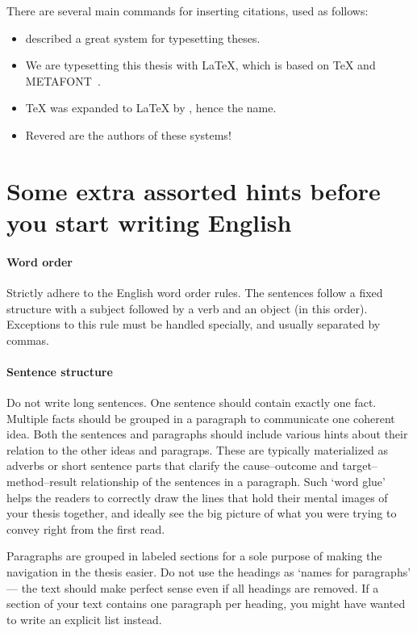 There are several main commands for inserting citations, used as follows:
\begin{itemize}
\item \citet{knuth1979tex} described a great system for typesetting theses.
\item We are typesetting this thesis with \LaTeX, which is based on \TeX{} and METAFONT~\cite{knuth1979tex}.
\item \TeX{} was expanded to \LaTeX{} by \citet{lamport1994latex}, hence the name.
\item Revered are the authors of these systems!~\cite{knuth1979tex,lamport1994latex}
\end{itemize}

\section{Some extra assorted hints before you start writing English}

\paragraph{Word order}
Strictly adhere to the English word order rules. The sentences follow a fixed structure with a subject followed by a verb and an object (in this order). Exceptions to this rule must be handled specially, and usually separated by commas.

\paragraph{Sentence structure}
Do not write long sentences. One sentence should contain exactly one fact. Multiple facts should be grouped in a paragraph to communicate one coherent idea. Both the sentences and paragraphs should include various hints about their relation to the other ideas and paragraps. These are typically materialized as adverbs or short sentence parts that clarify the cause--outcome and target--method--result relationship of the sentences in a paragraph. Such `word glue' helps the readers to correctly draw the lines that hold their mental images of your thesis together, and ideally see the big picture of what you were trying to convey right from the first read.

Paragraphs are grouped in labeled sections for a sole purpose of making the navigation in the thesis easier. Do not use the headings as `names for paragraphs' --- the text should make perfect sense even if all headings are removed. If a section of your text contains one paragraph per heading, you might have wanted to write an explicit list instead.

